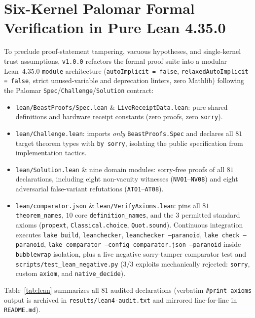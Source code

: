 \documentclass[11pt,letterpaper]{amsart}
\newcommand{\code}[1]{{\small\texttt{#1}}}
\begin{document}
\section{Six-Kernel Palomar Formal Verification in Pure Lean 4.35.0}
\label{sec:lean}

To preclude proof-statement tampering, vacuous hypotheses, and single-kernel
trust assumptions, \code{v1.0.0} refactors the formal proof suite into a modular
Lean~4.35.0 \code{module} architecture (\code{autoImplicit = false},
\code{relaxedAutoImplicit = false}, strict unused-variable and deprecation
linters, zero Mathlib) following the Palomar \code{Spec}/\code{Challenge}/\code{Solution}
contract:
\begin{itemize}
  \item \code{lean/BeastProofs/Spec.lean} \& \code{LiveReceiptData.lean}: pure
  shared definitions and hardware receipt constants (zero proofs, zero \code{sorry}).
  \item \code{lean/Challenge.lean}: imports \emph{only} \code{BeastProofs.Spec}
  and declares all $81$ target theorem types with \code{by sorry}, isolating the
  public specification from implementation tactics.
  \item \code{lean/Solution.lean} \& nine domain modules: sorry-free proofs of all
  $81$ declarations, including eight non-vacuity witnesses (\code{NV01}--\code{NV08})
  and eight adversarial false-variant refutations (\code{AT01}--\code{AT08}).
  \item \code{lean/comparator.json} \& \code{lean/VerifyAxioms.lean}: pins all
  $81$ \code{theorem\_names}, $10$ core \code{definition\_names}, and the $3$
  permitted standard axioms (\code{propext}, \code{Classical.choice},
  \code{Quot.sound}). Continuous integration executes \code{lake build},
  \code{leanchecker}, \code{leanchecker --paranoid}, \code{lake check --paranoid},
  \code{lake comparator --config comparator.json --paranoid} inside
  \code{bubblewrap} isolation, plus a live negative sorry-tamper comparator test
  and \code{scripts/test\_lean\_negative.py} ($3/3$ exploits mechanically rejected:
  \code{sorry}, custom \code{axiom}, and \code{native\_decide}).
\end{itemize}

Table~\ref{tab:lean} summarizes all $81$ audited declarations (verbatim
\code{\#print axioms} output is archived in \code{results/lean4-audit.txt} and
mirrored line-for-line in \code{README.md}).
\end{document}

